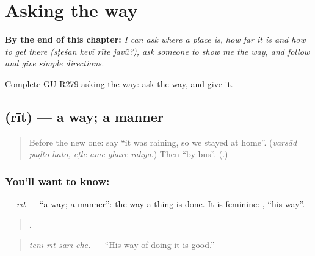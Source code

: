 
\chapter{Asking the way}
\label{ch:gu-asking-the-way}

\begin{chapteropening}
\textbf{By the end of this chapter:} \emph{I can ask where a place is, how far it is and how to get there (sṭeśan kevī rīte javũ?), ask someone to show me the way, and follow and give simple directions.}

Complete GU-R279-asking-the-way: ask the way, and give it.
\end{chapteropening}

\section[\texorpdfstring{\gu{રીત} (rīt)}{રીત (rīt)}]{ (rīt) — a way; a manner}

\label{lesson:GU-C279-rit}



\begin{quote}
Before the new one: say \textquotedblleft{}it was raining, so we stayed at home\textquotedblright{}. (\emph{varsād paḍto hato, eṭle ame ghare rahyā}.) Then \textquotedblleft{}by bus\textquotedblright{}. (\textbf{}.)
\end{quote}

\subsection*{You'll want to know: }
\textbf{} — \emph{rīt} — \textquotedblleft{}a way; a manner\textquotedblright{}: the way a thing is done. It is feminine: \textbf{ }, \textquotedblleft{}his way\textquotedblright{}.

\begin{quote}
\textbf{   .}
\end{quote}

\begin{quote}
\emph{tenī rīt sārī che.} — \textquotedblleft{}His way of doing it is good.\textquotedblright{}
\end{quote}

